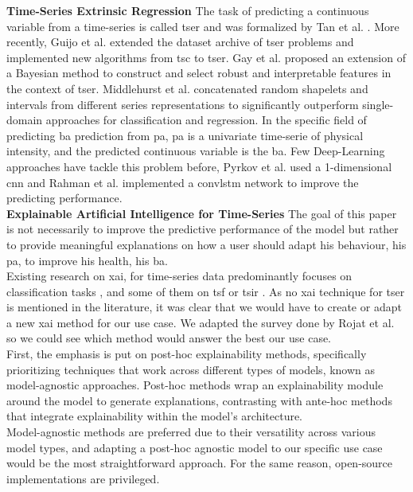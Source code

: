 \textbf{Time-Series Extrinsic Regression}
The task of predicting a continuous variable from a time-series is called  
\acrfull{tser} and was formalized by Tan et al. \cite{tan_time_2021}. More recently, Guijo et al. \cite{guijo-rubio_unsupervised_2023} extended the dataset archive \cite{tan_monash_2020} of \acrshort{tser} problems and implemented new algorithms from \acrfull{tsc} to \acrshort{tser}. Gay et al. \cite{gay_interpretable_2021} proposed an extension of a Bayesian method to construct and select robust and interpretable features in the context of \acrshort{tser}. 
Middlehurst et al. \cite{middlehurst_extracting_2023} concatenated random shapelets and intervals from different series representations to significantly outperform single-domain approaches for classification and regression. In the specific field of predicting \acrshort{ba} prediction from \acrshort{pa}, \acrshort{pa} is a univariate time-serie of physical intensity, and the predicted continuous variable is the \acrshort{ba}. 
Few Deep-Learning approaches have tackle this problem before, Pyrkov et al. \cite{pyrkov_extracting_2018} used a 1-dimensional \acrfull{cnn} and Rahman et al. \cite{rahman_deep_2019} implemented a \acrfull{convlstm} network to improve the predicting performance. \\

\textbf{Explainable Artificial Intelligence for Time-Series}
The goal of this paper is not necessarily to improve the predictive performance of the model but rather to provide meaningful explanations on how a user should adapt his behaviour, his \acrshort{pa}, to improve his health, his \acrshort{ba}. \\

Existing research on \acrfull{xai},  for time-series data predominantly focuses on classification tasks \cite{theissler_explainable_2022}, and some of them on \acrfull{tsf} or \acrfull{tsir} \cite{rojat_explainable_2021}. As no \acrshort{xai} technique for \acrshort{tser} is mentioned in the literature, it was clear that we would have to create or adapt a new \acrshort{xai} method for our use case. 
We adapted the survey done by Rojat et al. \cite{rojat_explainable_2021} so we could see which method would answer the best our use case. \\

First, the emphasis is put on post-hoc explainability methods, specifically prioritizing techniques that work across different types of models, known as model-agnostic approaches.
Post-hoc methods wrap an explainability module around the model to generate explanations, contrasting with ante-hoc methods that integrate explainability within the model's architecture. \\
Model-agnostic methods are preferred due to their versatility across various model types, and adapting a post-hoc agnostic model to our specific use case would be the most straightforward approach. For the same reason, open-source implementations are privileged. \\

